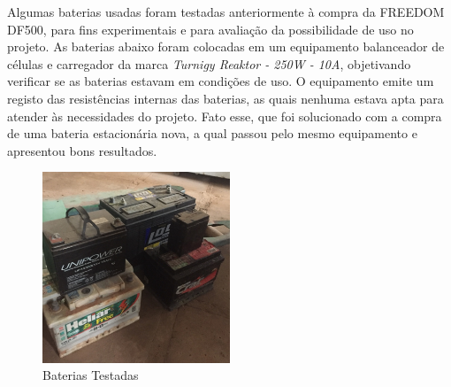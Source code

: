 		 Algumas baterias usadas foram testadas anteriormente à compra da FREEDOM DF500, para fins experimentais e para avaliação da possibilidade de uso no projeto. As baterias abaixo foram colocadas em um equipamento balanceador de células e carregador da marca \textit{Turnigy Reaktor - 250W - 10A}, objetivando verificar se as baterias estavam em condições de uso. O equipamento emite um registo das resistências internas das baterias, as quais nenhuma estava apta para atender às necessidades do projeto. Fato esse, que foi solucionado com a compra de uma bateria estacionária nova, a qual passou pelo mesmo equipamento e apresentou bons resultados.

  \begin{figure}[H]
    \centering
    \includegraphics[width=0.5\textwidth]{figuras/baterias_testadas}
    \caption{Baterias Testadas}
    \label{fig:baterias_testadas}
\end{figure}

